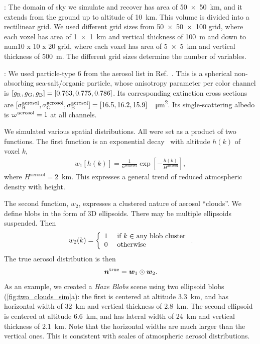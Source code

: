 \documentclass[10pt,letterpaper]{article}
\begin{document}
: The domain of sky we simulate and recover
has area of \SI{50 x 50}{\km}, and it extends from the ground up to
altitude of \SI{10}{\km}. This volume is divided into a rectilinear
grid. We used different grid sizes from \num{50 x 50 x 100} grid,
where each voxel has area of \SI{1 x 1}{\km} and vertical thickness of
\SI{100}{\metre} and down to num{10 x 10 x 20} grid, where each voxel
has area of \SI{5 x 5}{\km} and vertical thickness of
\SI{500}{\metre}. The different grid sizes determine the number of
variables.

: We used particle-type 6 from the aerosol list
in Ref.~\cite{Martonchik2009}. This is a spherical non-absorbing
sea-salt/organic particle, whose anisotropy parameter per color
channel is $[g_{\rm R},g_{\rm G},g_{\rm B}]=[0.763,0.775,0.786]$. Its
corresponding extinction cross sections are $[\sigma^{\rm
  aerosol}_{\rm R}, \sigma^{\rm aerosol}_{\rm G}, \sigma^{\rm
  aerosol}_{\rm
  B}]=[16.5,16.2,15.9]$~\si[sticky-per]{\per\micro\meter\squared}.
Its single-scattering albedo is $\varpi^{\rm aerosol}=1$ at all
channels.

We simulated various spatial distributions. All were set as a product
of two functions. The first function is an exponential
decay~\cite{Levi1980} with altitude $h(k)$ of voxel $k$,
\begin{align}
  w_1[h(k)] = \frac{1} {n^{sea level}}
  \exp\left[-\frac{h(k)}{H^\mathrm{aerosol}}\right],
\end{align}
where $H^\mathrm{aerosol}=2$~\si{\km}. This expresses a general trend
of reduced atmospheric density with height.

The second function, $w_2$, expresses a clustered nature of aerosol
``clouds''. We define blobs in the form of 3D ellipsoids. There may be
multiple ellipsoids suspended.  Then
\begin{equation}
  w_2(k) =
  \left\{
    \begin{array}{ll}
      1  & \mbox{ if $k\in$ any blob cluster} \\
      0  & \mbox{ otherwise}
      \label{eq:f2}
    \end{array}
  \right.
  .
  \hspace{-0.05cm}
\end{equation}
The true aerosol distribution is then
\begin{equation}
  \label{eq:ntrue}
  {\bm n}^{\rm true}={\bm w}_1\odot {\bm w}_2  .
  \hspace{-0.05cm}
\end{equation}
As an example, we created a {\em Haze Blobs} scene using two ellipsoid
blobs (\cref{fig:two_clouds_sim}a): the first is centered at altitude
\SI{3.3}{\km}, and has horizontal width of \SI{32}{\km} and vertical
thickness of \SI{2.8}{\km}. The second ellipsoid is centered at
altitude \SI{6.6}{\km}, and has lateral width of \SI{24}{\km} and
vertical thickness of \SI{2.1}{\km}. Note that the horizontal widths
are much larger than the vertical ones. This is consistent with scales
of atmospheric aerosol distributions.
\end{document}

